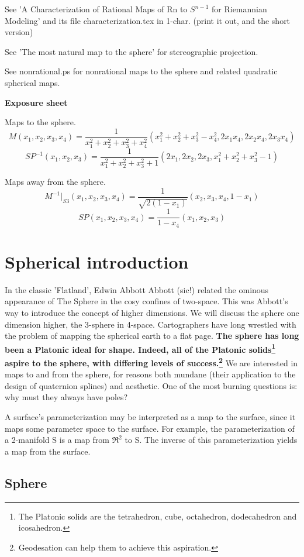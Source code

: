 \documentclass[11pt]{article}
\begin{document}
See 'A Characterization of Rational Maps of Rn to $S^{n-1}$ for Riemannian Modeling'
and its file characterization.tex in 1-char.  (print it out, and the short version)

See 'The most natural map to the sphere' for stereographic projection.

See nonrational.ps for nonrational maps to the sphere and 
related quadratic spherical maps.

{\bf Exposure sheet}

Maps to the sphere.
\[
	M(x_1,x_2,x_3,x_4) =
	\frac{1}{x_1^2 + x_2^2 + x_3^2 + x_4^2}
	(x_1^2 + x_2^2 + x_3^2 - x_4^2, 2x_1x_4, 2x_2x_4, 2x_3x_4)
\]
\[
SP^{-1}(x_1,x_2,x_3) = \frac{1}{x_1^2 + x_2^2 + x_3^2 + 1} 
                       (2x_1, 2x_2, 2x_3, x_1^2+x_2^2+x_3^2 - 1)
\]

Maps away from the sphere.
\[
M^{-1}|_{S3}(x_1,x_2,x_3,x_4) = \frac{1}{\sqrt{2(1-x_1)}}(x_2,x_3,x_4,1-x_1)
\]
\[
SP(x_1,x_2,x_3,x_4) = \frac{1}{1-x_4} (x_1,x_2,x_3)
\]

\section{Spherical introduction}

In the classic 'Flatland',
Edwin Abbott Abbott (sic!) related the ominous appearance of The Sphere in the
cosy confines of two-space.
This was Abbott's way to introduce the concept of higher dimensions.
We will discuss the sphere one dimension higher, the 3-sphere in 4-space.
Cartographers have long wrestled with the problem of mapping the spherical earth
to a flat page.
{\bf The sphere has long been a Platonic ideal for shape.
Indeed, all of the Platonic solids\footnote{The Platonic solids are the tetrahedron,
  cube, octahedron, dodecahedron and icosahedron.}
aspire to the sphere, with differing levels of success.\footnote{Geodesation can
  help them to achieve this aspiration.}
}
We are interested in maps to and from the sphere, 
for reasons both mundane (their application to the design of quaternion splines)
and aesthetic.
One of the most burning questions is: why must they always have poles?

A surface's parameterization may be interpreted as a map to the surface,
since it maps some parameter space to the surface.
For example, the parameterization of a 2-manifold S is a map from $\Re^2$ to S.
The inverse of this parameterization yields a map from the surface.

\subsection{Sphere}
\end{document}
